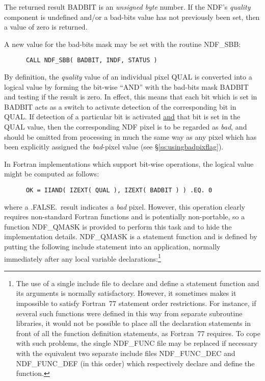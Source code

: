 \documentclass[twoside,11pt]{article}
\newcommand{\htmlref}[2]{#1}
\newcommand{\st}[1]{{\em{#1}}}
\begin{document}
The returned result BADBIT is an \st{unsigned byte\/} number.
If the NDF's \st{quality\/} component is undefined and/or a bad-bits value has
not previously been set, then a value of zero is returned. 

A new value for the bad-bits mask may be set with the routine \htmlref{NDF\_SBB}{NDF_SBB}:

\small
\begin{verbatim}
      CALL NDF_SBB( BADBIT, INDF, STATUS )
\end{verbatim}
\normalsize

By definition, the \st{quality\/} value of an individual pixel QUAL is
converted into a logical value by forming the bit-wise ``AND'' with the
bad-bits mask BADBIT and testing if the result is zero. 
In effect, this means that each bit which is set in BADBIT acts as a switch to
activate detection of the corresponding bit in QUAL.
If detection of a particular bit is activated \underline{and} that bit is
set in the QUAL value, then the corresponding NDF pixel is to be regarded as
\st{bad}, and should be omitted from processing in much the same way as any
pixel which has been explicitly assigned the \st{bad\/}-pixel value (see 
\S\ref{ss:usingbadpixflag}). 

In Fortran implementations which support bit-wise operations, the
logical value might be computed as follows:

\small
\begin{verbatim}
      OK = IIAND( IZEXT( QUAL ), IZEXT( BADBIT ) ) .EQ. 0
\end{verbatim}
\normalsize

where a .FALSE.\ result indicates a \st{bad\/} pixel.
However, this operation clearly requires non-standard Fortran
functions and is potentially non-portable, so a function \htmlref{NDF\_QMASK}{NDF_QMASK} is
provided to perform this task and to hide the implementation details.
NDF\_QMASK is a statement function and is defined by putting the following
include statement into an application, normally immediately after any local
variable declarations:\footnote{The use of a single include file to declare
and define a statement function and its arguments is normally satisfactory. 
However, it sometimes makes it impossible to satisfy Fortran~77 statement
order restrictions. 
For instance, if several such functions were defined in this way from
separate subroutine libraries, it would not be possible to place all the
declaration statements in front of all the function definition statements,
as Fortran~77 requires. 
To cope with such problems, the single NDF\_FUNC file may be replaced if 
necessary with the equivalent two separate include files NDF\_FUNC\_DEC and
NDF\_FUNC\_DEF (in this order) which respectively declare and define the
function.}
\end{document}
